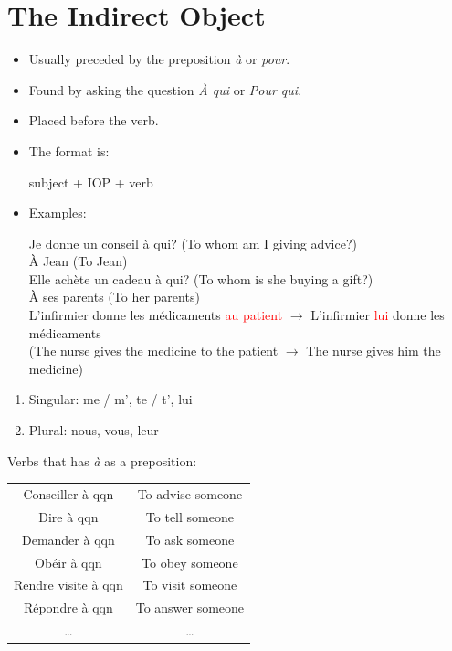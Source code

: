 \documentclass{book}
\begin{document}
\chapter{The Indirect Object}
    \begin{itemize}
        \item Usually preceded by the preposition \textit{à} or \textit{pour}.
        \item Found by asking the question \textit{À qui} or \textit{Pour qui}.
        \item Placed before the verb.
        \item The format is:  
            \begin{center}
                subject + IOP + verb
            \end{center}
        \item Examples:
            \begin{center}
                Je donne un conseil à qui? (To whom am I giving advice?) \\
                À Jean (To Jean) \\
                Elle achète un cadeau à qui? (To whom is she buying a gift?) \\
                À ses parents (To her parents) \\
                L'infirmier donne les médicaments \textcolor{red}{au patient} $\to$ L'infirmier \textcolor{red}{lui} donne les médicaments \\
                (The nurse gives the medicine to the patient $\to$ The nurse gives him the medicine)
            \end{center}
    \end{itemize}
    \begin{enumerate}
        \item Singular: me / m', te / t', lui
        \item Plural: nous, vous, leur
    \end{enumerate}
    Verbs that has \textit{à} as a preposition:
        \begin{center}
            \begin{tabular}{|c|c|}
                \hline
                Conseiller à qqn & To advise someone \\
                Dire à qqn & To tell someone \\
                Demander à qqn & To ask someone \\
                Obéir à qqn & To obey someone \\
                Rendre visite à qqn & To visit someone \\
                Répondre à qqn & To answer someone \\
                \dots & \dots \\
                \hline
            \end{tabular}
        \end{center}
\end{document}
